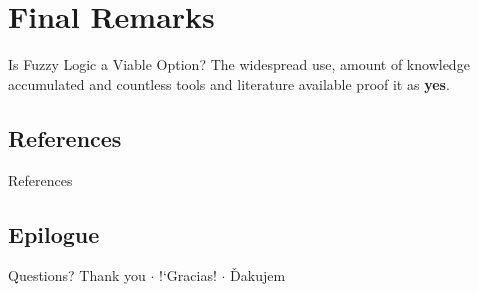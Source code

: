 \documentclass[hyperref={unicode}]{beamer}
\begin{document}
\section{Final Remarks}

\begin{frame}{Is Fuzzy Logic a Viable Option?}
	The widespread use, amount of knowledge accumulated and countless tools and literature available proof it as \textbf{yes}.
\end{frame}


\subsection{References}

\begin{frame}[allowframebreaks]{References}
	\printbibliography
\end{frame}


\subsection{Epilogue}

\begin{frame}{Questions?}
	\centering
	{\large Thank you $\cdot$ !`Gracias! $\cdot$ Ďakujem}
\end{frame}
\end{document}
